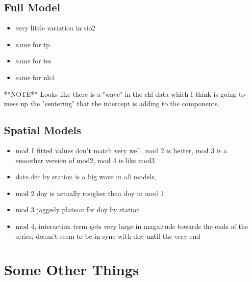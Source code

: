 \documentclass[12pt]{amsart}
\begin{document}
\subsection{Full Model}
\begin{itemize}
\item very little variation in sio2
\item same for tp
\item same for tss
\item same for nh4
\end{itemize}
**NOTE** Looks like there is a "wave" in the chl data which I think is going to mess up the "centering" that the intercept is adding to the components.

\subsection{Spatial Models}

\begin{itemize}
\item mod 1 fitted values don't match very well, mod 2 is better, mod 3 is a smoother version of mod2, mod 4 is like mod3
\item date.dec by station is a big wave in all models, 
\item mod 2 doy is actually rougher than doy in mod 1
\item mod 3 jaggedy plateau for doy by station
\item mod 4, interaction term gets very large in magnitude towards the ends of the series, doesn't seem to be in sync with doy until the very end

\end{itemize}


\section{Some Other Things}
\end{document}
